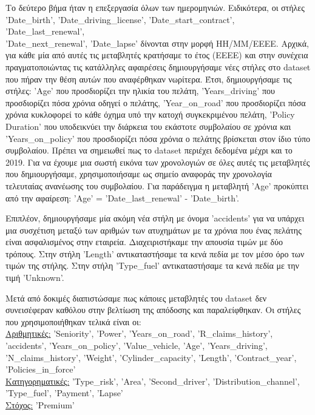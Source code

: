\documentclass{llncs}
\begin{document}
Το δεύτερο βήμα ήταν η επεξεργασία όλων των ημερομηνιών. Ειδικότερα, οι στήλες 'Date\_birth', 'Date\_driving\_license', 'Date\_start\_contract', 'Date\_last\_renewal', \\
'Date\_next\_renewal', 'Date\_lapse' δίνονται στην μορφή ΗΗ/ΜΜ/ΕΕΕΕ. Αρχικά, για κάθε μία από αυτές τις μεταβλητές κρατήσαμε το έτος (ΕΕΕΕ) και στην συνέχεια πραγματοποιώντας τις κατάλληλες αφαιρέσεις
δημιουργήσαμε νέες στήλες στο dataset που πήραν την θέση αυτών που αναφέρθηκαν νωρίτερα. Έτσι, δημιουργήσαμε τις στήλες: 'Age' που προσδιορίζει την ηλικία του πελάτη, 'Years\_driving' που προσδιορίζει 
πόσα χρόνια οδηγεί ο πελάτης, 'Year\_on\_road' που προσδιορίζει πόσα χρόνια κυκλοφορεί το κάθε όχημα υπό την κατοχή συγκεκριμένου πελάτη, 'Policy Duration' που υποδεικνύει την διάρκεια του εκάστοτε συμβολαίου σε χρόνια και 
'Years\_on\_policy' που προσδιορίζει πόσα χρόνια ο πελάτης βρίσκεται στον ίδιο τύπο συμβολαίου. Πρέπει να σημειωθεί πως το dataset περιέχει δεδομένα μέχρι και το 2019. Για να έχουμε μια σωστή εικόνα των χρονολογιών
σε όλες αυτές τις μεταβλητές που δημιουργήσαμε, χρησιμοποιήσαμε ως σημείο αναφοράς την χρονολογία τελευταίας ανανέωσης του συμβολαίου. Για παράδειγμα η μεταβλητή 'Age' προκύπτει από την αφαίρεση:
'Age' = 'Date\_last\_renewal' - 'Date\_birth'.

Επιπλέον, δημιουργήσαμε μία ακόμη νέα στήλη με όνομα 'accidents' για να υπάρχει μια συσχέτιση μεταξύ των αριθμών των ατυχημάτων με τα χρόνια που ένας πελάτης είναι ασφαλισμένος στην εταιρεία.
Διαχειριστήκαμε την απουσία τιμών με δύο τρόπους. Στην στήλη 'Length' αντικαταστήσαμε τα κενά πεδία με τον μέσο όρο των τιμών της στήλης. Στην στήλη 'Type\_fuel' αντικαταστήσαμε τα κενά πεδία με την τιμή 
'Unknown'.

Μετά από δοκιμές διαπιστώσαμε πως κάποιες μεταβλητές του dataset δεν συνεισέφεραν καθόλου στην βελτίωση της απόδοσης και παραλείφθηκαν. 
Οι στήλες που χρησιμοποιήθηκαν τελικά είναι οι:\\
\underline{Αριθμητικές:} 'Seniority', 'Power', 'Years\_on\_road', 'R\_claims\_history', 'accidents', 'Years\_on\_policy', 
 'Value\_vehicle, 'Age', 'Years\_driving', 'N\_claims\_history', 'Weight', 'Cylinder\_capacity', 
 'Length', 'Contract\_year', 'Policies\_in\_force'
\\\underline{Κατηγορηματικές:} 'Type\_risk', 'Area', 'Second\_driver', 'Distribution\_channel',\\'Type\_fuel', 'Payment', 'Lapse'
\\\underline{Στόχος:} 'Premium'
\end{document}
